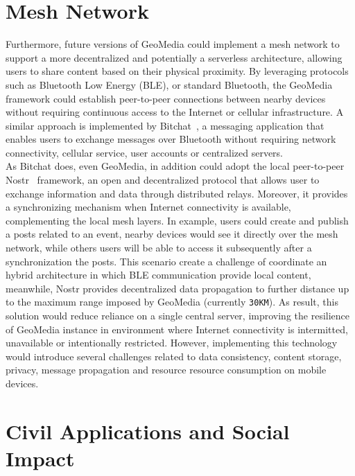 \section{Mesh Network}
\label{sub:nostr}
Furthermore, future versions of GeoMedia could implement a mesh network to support a more decentralized and potentially a serverless architecture, allowing users to share content based on their physical proximity.
By leveraging protocols such as Bluetooth Low Energy (BLE), or standard Bluetooth, the GeoMedia framework could establish peer-to-peer connections between nearby devices without requiring continuous access to the Internet or cellular infrastructure. A similar approach is implemented by Bitchat~\cite{site:bitchat}, a messaging application that enables users to exchange messages over Bluetooth without requiring network connectivity, cellular service, user accounts or centralized servers. \\
As Bitchat does, even GeoMedia, in addition could adopt the local peer-to-peer Nostr~\cite{site:nostr} framework, an open and decentralized protocol that allows user to exchange information and data through distributed relays. Moreover, it provides a synchronizing mechanism when Internet connectivity is available, complementing the local mesh layers. In example, users could create and publish a posts related to an event, nearby devices would see it directly over the mesh network, while others users will be able to access it subsequently after a synchronization the posts. This scenario create a challenge of coordinate an hybrid architecture in which BLE communication provide local content, meanwhile, Nostr provides decentralized data propagation to further distance up to the maximum range imposed by GeoMedia (currently \texttt{30KM}). As result, this solution would reduce reliance on a single central server, improving the resilience of GeoMedia instance in environment where Internet connectivity is intermitted, unavailable or intentionally restricted. 
However, implementing this technology would introduce several challenges related to data consistency, content storage, privacy, message propagation and resource resource consumption on mobile devices.

\section{Civil Applications and Social Impact}

